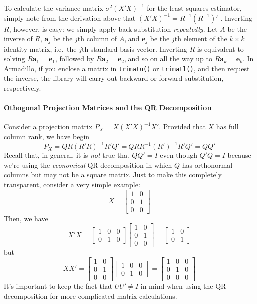 \documentclass[12pt]{article}
\theoremstyle{definition}
\begin{document}
To calculate the variance matrix $\sigma^2 (X'X)^{-1}$ for the least-squares estimator, simply note from the derivation above that $(X'X)^{-1} = R^{-1} (R^{-1})'$ . Inverting $R$, however, is easy: we simply apply back-substitution \emph{repeatedly}. Let $A$ be the inverse of $R$, $\mathbf{a}_j$ be the $j$th column of $A$, and $\mathbf{e}_j$ be the $j$th element of the $k\times k$ identity matrix, i.e.\ the $j$th standard basis vector. Inverting $R$ is equivalent to solving $R \mathbf{a}_1 = \mathbf{e}_1$, followed by $R \mathbf{a}_2 = \mathbf{e}_2$, and so on all the way up to $R \mathbf{a}_k = \mathbf{e}_k$. In Armadillo, if you enclose a matrix in \texttt{trimatu()} or \texttt{trimatl()}, and then request the inverse, the library will carry out backward or forward substitution, respectively.

\paragraph{Othogonal Projection Matrices and the QR Decomposition}
Consider a projection matrix $P_X = X (X'X)^{-1}X'$. Provided that $X$ has full column rank, we have
begin
  $$P_X  = QR(R'R)^{-1}R'Q' = QRR^{-1} (R')^{-1}R'Q' = QQ'$$
Recall that, in general, it is \emph{not} true that $QQ' = I$ even though $Q'Q = I$ because we're using the \emph{economical} QR decomposition in which $Q$ has orthonormal columns but may not be a square matrix. Just to make this completely transparent, consider a very simple example:
	$$X = \left[ \begin{array}
		{cc} 1 & 0 \\ 0 & 1 \\ 0 & 0
	\end{array}\right]$$
Then, we have
	$$X'X = \left[\begin{array}
		{ccc} 1& 0 & 0 \\ 0 & 1 & 0
	\end{array} \right]\left[ \begin{array}
		{cc} 1 & 0 \\ 0 & 1 \\ 0 & 0
	\end{array}\right] = \left[\begin{array}
		{cc} 1 & 0 \\ 0 & 1
	\end{array} \right]$$
but 
	$$XX' = \left[ \begin{array}
		{cc} 1 & 0 \\ 0 & 1 \\ 0 & 0
	\end{array}\right]\left[\begin{array}
		{ccc} 1& 0 & 0 \\ 0 & 1 & 0
	\end{array} \right] = \left[\begin{array}
		{ccc} 1 & 0 & 0 \\ 0 & 1 & 0 \\ 0 & 0 & 0
	\end{array} \right]$$
It's important to keep the fact that $UU' \neq I$ in mind when using the QR decomposition for more complicated matrix calculations.
\end{document}
